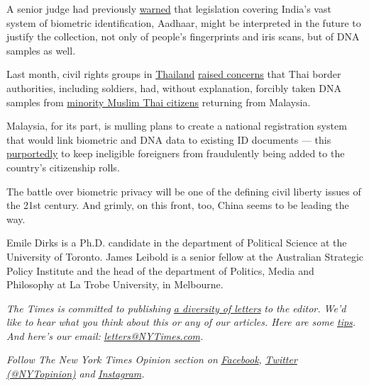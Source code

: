 A senior judge had previously
\href{https://www.thehindu.com/news/national/can-dna-be-taken-for-aadhaar-asks-judge/article23447019.ece}{warned}
that legislation covering India's vast system of biometric
identification, Aadhaar, might be interpreted in the future to justify
the collection, not only of people's fingerprints and iris scans, but of
DNA samples as well.

Last month, civil rights groups in
\href{https://www.khaosodenglish.com/politics/2020/06/01/coronavirus-returnees-ordered-to-give-up-dna-samples/}{Thailand}
\href{https://www.khaosodenglish.com/politics/2020/06/01/coronavirus-returnees-ordered-to-give-up-dna-samples/}{raised
concerns} that Thai border authorities, including soldiers, had, without
explanation, forcibly taken DNA samples from
\href{https://www.codastory.com/authoritarian-tech/surveillance-muslims-thailand/}{minority
Muslim Thai citizens} returning from Malaysia.

Malaysia, for its part, is mulling plans to create a national
registration system that would link biometric and DNA data to existing
ID documents --- this
\href{https://www.thestar.com.my/news/nation/2019/09/23/pbs-nrd-must-fast-track-setting-up-of-dna-database}{purportedly}
to keep ineligible foreigners from fraudulently being added to the
country's citizenship rolls.

The battle over biometric privacy will be one of the defining civil
liberty issues of the 21st century. And grimly, on this front, too,
China seems to be leading the way.

Emile Dirks is a Ph.D. candidate in the department of Political Science
at the University of Toronto. James Leibold is a senior fellow at the
Australian Strategic Policy Institute and the head of the department of
Politics, Media and Philosophy at La Trobe University, in Melbourne.

\emph{The Times is committed to publishing}
\href{https://www.nytimes3xbfgragh.onion/2019/01/31/opinion/letters/letters-to-editor-new-york-times-women.html}{\emph{a
diversity of letters}} \emph{to the editor. We'd like to hear what you
think about this or any of our articles. Here are some}
\href{https://help.nytimes3xbfgragh.onion/hc/en-us/articles/115014925288-How-to-submit-a-letter-to-the-editor}{\emph{tips}}\emph{.
And here's our email:}
\href{mailto:letters@NYTimes.com}{\emph{letters@NYTimes.com}}\emph{.}

\emph{Follow The New York Times Opinion section on}
\href{https://www.facebookcorewwwi.onion/nytopinion}{\emph{Facebook}}\emph{,}
\href{http://twitter.com/NYTOpinion}{\emph{Twitter (@NYTopinion)}}
\emph{and}
\href{https://www.instagram.com/nytopinion/}{\emph{Instagram}}\emph{.}

